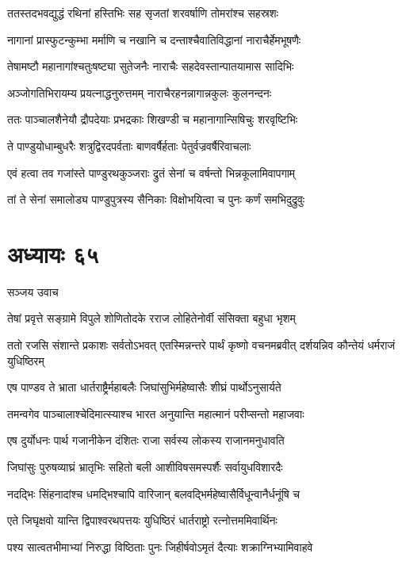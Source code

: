 \twolineshloka
{ततस्तदभवद्युद्धं रथिनां हस्तिभिः सह}
{सृजतां शरवर्षाणि तोमरांश्च सहस्रशः}


\twolineshloka
{नागानां प्रास्फुटन्कुम्भा मर्माणि च नखानि च}
{दन्ताश्चैवातिविद्धानां नाराचैर्हेमभूषणैः}


\twolineshloka
{तेषामष्टौ महानागांश्चतुःषष्ट्या सुतेजनैः}
{नाराचैः सहदेवस्तान्पातयामास सादिभिः}


\twolineshloka
{अञ्जोगतिभिरायम्य प्रयत्नाद्धनुरुत्तमम्}
{नाराचैरहनन्नागान्नकुलः कुलनन्दनः}


\twolineshloka
{ततः पाञ्चालशैनेयौ द्रौपदेयाः प्रभद्रकाः}
{शिखण्डी च महानागान्सिषिचुः शरवृष्टिभिः}


\twolineshloka
{ते पाण्डुयोधाम्बुधरैः शत्रुद्विरदपर्वताः}
{बाणवर्षैर्हताः पेतुर्वज्रवर्षैरिवाचलाः}


\twolineshloka
{एवं हत्वा तव गजांस्ते पाण्डुरथकुञ्जराः}
{द्रुतं सेनां च वर्षन्तो भिन्नकूलामिवापगाम्}


\twolineshloka
{तां ते सेनां समालोड्य पाण्डुपुत्रस्य सैनिकाः}
{विक्षोभयित्वा च पुनः कर्णं समभिदुद्रुवुः}


\chapter{अध्यायः ६५}
\twolineshloka
{सञ्जय उवाच}
{}


\twolineshloka
{तेषां प्रवृत्ते सङ्ग्रामे विपुले शोणितोदके}
{रराज लोहितेनोर्वी संसिक्ता बहुधा भृशम्}


\threelineshloka
{ततो रजसि संशान्ते प्रकाशः सर्वतोऽभवत्}
{एतस्मिन्नन्तरे पार्थं कृष्णो वचनमब्रवीत्}
{दर्शयन्निव कौन्तेयं धर्मराजं युधिष्ठिरम्}


\twolineshloka
{एष पाण्डव ते भ्राता धार्तराष्ट्रैर्महाबलैः}
{जिघांसुभिर्महेष्वासैः शीघ्रं पार्थोऽनुसार्यते}


\twolineshloka
{तमन्वगेव पाञ्चालाश्चेदिमात्स्याश्च भारत}
{अनुयान्ति महात्मानं परीप्सन्तो महाजवाः}


\twolineshloka
{एष दुर्योधनः पार्थ गजानीकेन दंशितः}
{राजा सर्वस्य लोकस्य राजानमनुधावति}


\twolineshloka
{जिघांसुः पुरुषव्याघ्रं भ्रातृभिः सहितो बली}
{आशीविषसमस्पर्शैः सर्वायुधविशारदैः}


\twolineshloka
{नदद्भिः सिंहनादांश्च धमद्भिश्चापि वारिजान्}
{बलवद्भिर्महेष्वासैर्विधून्वानैर्धनूंषि च}


\twolineshloka
{एते जिघृक्षवो यान्ति द्विपाश्वरथपत्तयः}
{युधिष्ठिरं धार्तराष्ट्रो रत्नोत्तममिवार्थिनः}


\twolineshloka
{पश्य सात्वतभीमाभ्यां निरुद्धा विष्ठिताः पुनः}
{जिहीर्षवोऽमृतं दैत्याः शक्राग्निभ्यामिवाहवे}



